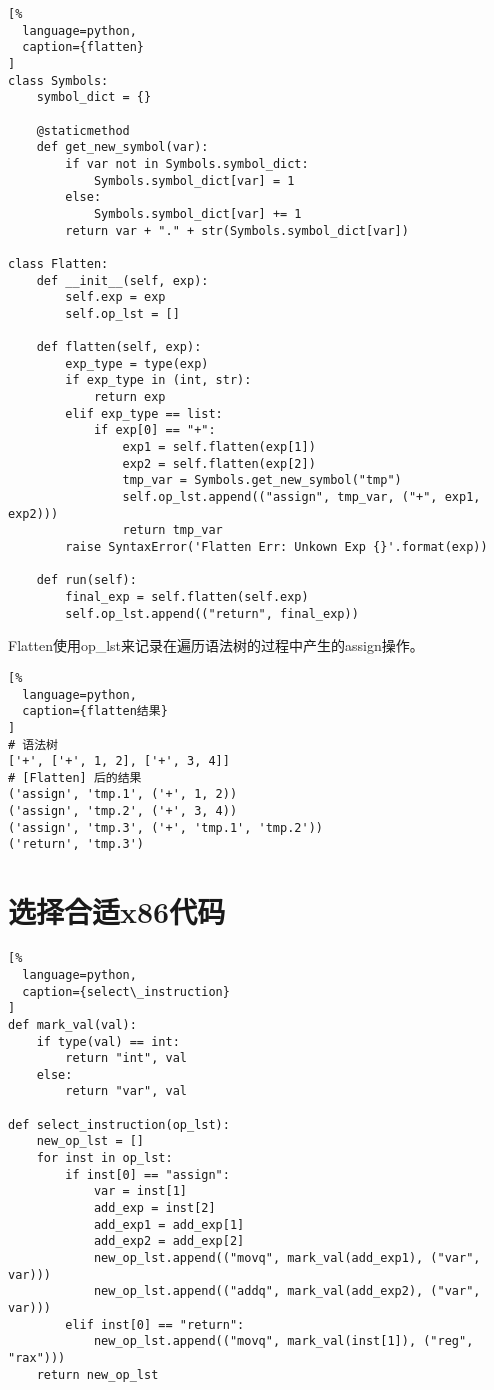 \begin{lstlisting}[%
  language=python,
  caption={flatten}
]
class Symbols:
    symbol_dict = {}

    @staticmethod
    def get_new_symbol(var):
        if var not in Symbols.symbol_dict:
            Symbols.symbol_dict[var] = 1
        else:
            Symbols.symbol_dict[var] += 1
        return var + "." + str(Symbols.symbol_dict[var])

class Flatten:
    def __init__(self, exp):
        self.exp = exp
        self.op_lst = []
    
    def flatten(self, exp):
        exp_type = type(exp)
        if exp_type in (int, str):
            return exp
        elif exp_type == list:
            if exp[0] == "+":
                exp1 = self.flatten(exp[1])
                exp2 = self.flatten(exp[2])
                tmp_var = Symbols.get_new_symbol("tmp")
                self.op_lst.append(("assign", tmp_var, ("+", exp1, exp2)))
                return tmp_var
        raise SyntaxError('Flatten Err: Unkown Exp {}'.format(exp))

    def run(self):
        final_exp = self.flatten(self.exp)
        self.op_lst.append(("return", final_exp))
\end{lstlisting}

Flatten使用op\_lst来记录在遍历语法树的过程中产生的assign操作。

\begin{lstlisting}[%
  language=python,
  caption={flatten结果}
]
# 语法树
['+', ['+', 1, 2], ['+', 3, 4]]
# [Flatten] 后的结果
('assign', 'tmp.1', ('+', 1, 2))
('assign', 'tmp.2', ('+', 3, 4))
('assign', 'tmp.3', ('+', 'tmp.1', 'tmp.2'))
('return', 'tmp.3')
\end{lstlisting}

\section{选择合适x86代码}

\begin{lstlisting}[%
  language=python,
  caption={select\_instruction}
]
def mark_val(val):
    if type(val) == int:
        return "int", val
    else:
        return "var", val

def select_instruction(op_lst):
    new_op_lst = []
    for inst in op_lst:
        if inst[0] == "assign":
            var = inst[1]
            add_exp = inst[2]
            add_exp1 = add_exp[1]
            add_exp2 = add_exp[2]
            new_op_lst.append(("movq", mark_val(add_exp1), ("var", var)))
            new_op_lst.append(("addq", mark_val(add_exp2), ("var", var)))
        elif inst[0] == "return":
            new_op_lst.append(("movq", mark_val(inst[1]), ("reg", "rax")))
    return new_op_lst
\end{lstlisting}

